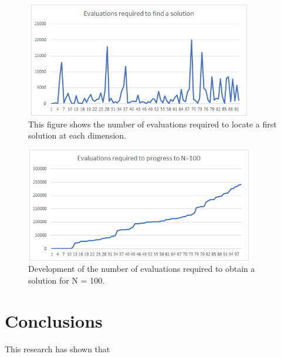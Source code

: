 \documentclass[a4paper,onecolumn,11pt]{article}
\begin{document}
\begin{figure}[!htbp]
	\centering	
	\includegraphics[width=10cm, height=5cm]{EvaluationsPerDimension}
	\caption{This figure shows the number of evaluations required to locate a first solution at each dimension.}
\end{figure}

\begin{figure}[!htbp]
	\centering	
	\includegraphics[width=10cm, height=5cm]{EvaluationProgress}
	\caption{Development of the number of evaluations required to obtain a solution for N = 100.}
\end{figure}


\section{Conclusions}
This research has shown that 
\end{document}
